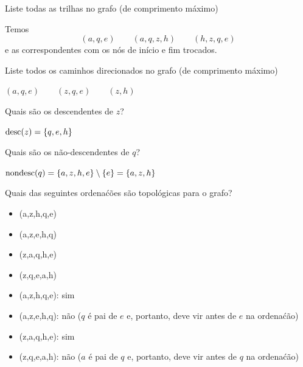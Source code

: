 \begin{exenumerate}
    \item Liste todas as trilhas no grafo (de comprimento m\'aximo)
    
    \begin{solution}
        Temos
        $$(a,q,e) \quad \quad (a,q,z,h) \quad \quad  (h,z,q,e)$$
        e as correspondentes com os n\'os de in\'icio e fim trocados.
    \end{solution}
    
    \item Liste todos os caminhos direcionados no grafo (de comprimento m\'aximo)
    \begin{solution}
        $(a,q,e) \quad \quad (z,q,e) \quad \quad (z,h) $
    \end{solution}
    
    \item Quais s\~ao os descendentes de $z$?
    
    \begin{solution}
        $\textrm{desc}(z) =\{q,e,h\}$
    \end{solution}
    
    
    \item Quais s\~ao os n\~ao-descendentes de $q$?
    
    \begin{solution}
        $\textrm{nondesc}(q) = \{a,z,h,e\} \setminus \{e\} = \{a,z,h\}$
    \end{solution}
    
    
    \item Quais das seguintes ordena\'c\~oes s\~ao topol\'ogicas para o grafo?
    \begin{itemize}
        \item (a,z,h,q,e)
        \item (a,z,e,h,q)
        \item (z,a,q,h,e)
        \item (z,q,e,a,h)
    \end{itemize}
    
    \begin{solution}
        \begin{itemize}
            \item (a,z,h,q,e): sim
            \item (a,z,e,h,q): n\~ao ($q$ \'e pai de $e$ e, portanto, deve vir antes de $e$ na ordena\'c\~ao)
            \item (z,a,q,h,e): sim
            \item (z,q,e,a,h): n\~ao ($a$ \'e pai de $q$ e, portanto, deve vir antes de $q$ na ordena\'c\~ao)
        \end{itemize}
    \end{solution}
    
\end{exenumerate}

